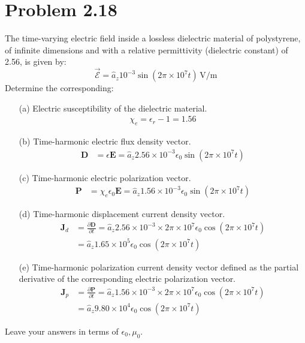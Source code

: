 \documentclass[12pt]{article}
\begin{document}
\section*{Problem 2.18}
The time-varying electric field inside a lossless dielectric material of polystyrene, of infinite dimensions and with a relative permittivity (dielectric constant) of 2.56, is given by:
\[
\vec{\mathcal{E}} = \hat{a}_z 10^{-3} \sin(2\pi \times 10^7 t) \, \text{V/m}
\]
Determine the corresponding:
\begin{itemize}
\item[(a)] Electric susceptibility of the dielectric material.
  \begin{align*}
    \chi_e = \epsilon_r - 1 = 1.56
  \end{align*}
\item[(b)] Time-harmonic electric flux density vector.
  \begin{align*}
\bm{D} &= \epsilon\bm{E} = \hat{a}_z  2.56\times10^{-3} \epsilon_0\sin(2\pi \times 10^7 t)
  \end{align*}
\item[(c)] Time-harmonic electric polarization vector.
    \begin{align*}
      \bm{P} &= \chi_e\epsilon_0\bm{E} = \hat{a}_z  1.56\times10^{-3} \epsilon_0\sin(2\pi \times 10^7 t)
  \end{align*}
\item[(d)] Time-harmonic displacement current density vector.
      \begin{align*}
        \bm{J}_d &= \frac{\partial \bm{D}}{\partial t} = \hat{a}_z  2.56\times10^{-3}\times2\pi \times 10^7 \epsilon_0\cos(2\pi \times 10^7 t) \\
                 &=  \hat{a}_z1.65\times 10^5\epsilon_0\cos(2\pi \times 10^7 t)
  \end{align*}
\item[(e)] Time-harmonic polarization current density vector defined as the partial derivative of the corresponding electric polarization vector.
        \begin{align*}
          \bm{J}_p &= \frac{\partial \bm{P}}{\partial t} = \hat{a}_z  1.56\times10^{-3}\times 2\pi \times 10^7 \epsilon_0\cos(2\pi \times 10^7 t) \\
                   &= \hat{a}_z 9.80\times 10^4 \epsilon_0\cos(2\pi \times 10^7 t)
  \end{align*}
\end{itemize}
Leave your answers in terms of \( \epsilon_0, \mu_0 \).
\end{document}
